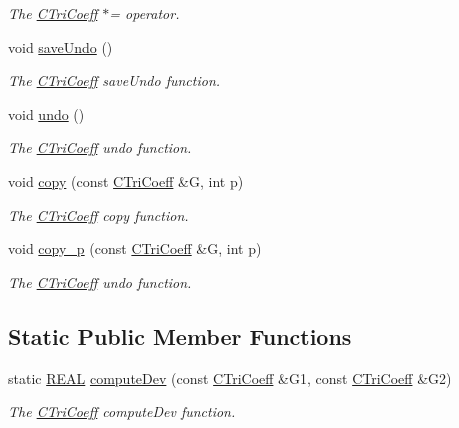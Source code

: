 \begin{DoxyCompactItemize}
\begin{DoxyCompactList}\small\item\em The \hyperlink{classCTriCoeff}{C\-Tri\-Coeff} $\ast$= operator. \end{DoxyCompactList}\item 
void \hyperlink{classCTriCoeff_a9886af4188561152d331366cfaec1c53}{save\-Undo} ()
\begin{DoxyCompactList}\small\item\em The \hyperlink{classCTriCoeff}{C\-Tri\-Coeff} save\-Undo function. \end{DoxyCompactList}\item 
void \hyperlink{classCTriCoeff_a8202256093cb071f6ae95887ea1c8dde}{undo} ()
\begin{DoxyCompactList}\small\item\em The \hyperlink{classCTriCoeff}{C\-Tri\-Coeff} undo function. \end{DoxyCompactList}\item 
void \hyperlink{classCTriCoeff_ae0b9dd50b8bef198ddd02ba8027d11a3}{copy} (const \hyperlink{classCTriCoeff}{C\-Tri\-Coeff} \&G, int p)
\begin{DoxyCompactList}\small\item\em The \hyperlink{classCTriCoeff}{C\-Tri\-Coeff} copy function. \end{DoxyCompactList}\item 
void \hyperlink{classCTriCoeff_a6568774c5e5a6fe066c739a718de1ba6}{copy\-\_\-p} (const \hyperlink{classCTriCoeff}{C\-Tri\-Coeff} \&G, int p)
\begin{DoxyCompactList}\small\item\em The \hyperlink{classCTriCoeff}{C\-Tri\-Coeff} undo function. \end{DoxyCompactList}\end{DoxyCompactItemize}
\subsection*{Static Public Member Functions}
\begin{DoxyCompactItemize}
\item 
static \hyperlink{util_8h_a5821460e95a0800cf9f24c38915cbbde}{R\-E\-A\-L} \hyperlink{classCTriCoeff_a5966b12dbe81e9e50f5397647cb18044}{compute\-Dev} (const \hyperlink{classCTriCoeff}{C\-Tri\-Coeff} \&G1, const \hyperlink{classCTriCoeff}{C\-Tri\-Coeff} \&G2)
\begin{DoxyCompactList}\small\item\em The \hyperlink{classCTriCoeff}{C\-Tri\-Coeff} compute\-Dev function. \end{DoxyCompactList}\end{DoxyCompactItemize}
